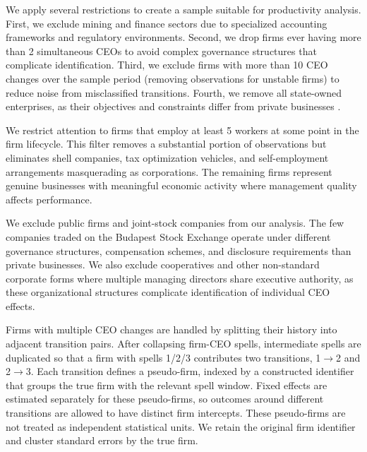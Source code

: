 \documentclass[11pt,a4paper]{article}
\begin{document}
We apply several restrictions to create a sample suitable for productivity analysis. First, we exclude mining and finance sectors due to specialized accounting frameworks and regulatory environments. Second, we drop firms ever having more than 2 simultaneous CEOs to avoid complex governance structures that complicate identification. Third, we exclude firms with more than 10 CEO changes over the sample period (removing observations for unstable firms) to reduce noise from misclassified transitions. Fourth, we remove all state-owned enterprises, as their objectives and constraints differ from private businesses \citep{orban2019inception, shleifer1994politicians}.

We restrict attention to firms that employ at least 5 workers at some point in the firm lifecycle. This filter removes a substantial portion of observations but eliminates shell companies, tax optimization vehicles, and self-employment arrangements masquerading as corporations. The remaining firms represent genuine businesses with meaningful economic activity where management quality affects performance.

We exclude public firms and joint-stock companies from our analysis. The few companies traded on the Budapest Stock Exchange operate under different governance structures, compensation schemes, and disclosure requirements than private businesses. We also exclude cooperatives and other non-standard corporate forms where multiple managing directors share executive authority, as these organizational structures complicate identification of individual CEO effects.

Firms with multiple CEO changes are handled by splitting their history into adjacent transition pairs. After collapsing firm-CEO spells, intermediate spells are duplicated so that a firm with spells 1/2/3 contributes two transitions, 1$\to$2 and 2$\to$3. Each transition defines a pseudo-firm, indexed by a constructed identifier that groups the true firm with the relevant spell window. Fixed effects are estimated separately for these pseudo-firms, so outcomes around different transitions are allowed to have distinct firm intercepts. These pseudo-firms are not treated as independent statistical units. We retain the original firm identifier and cluster standard errors by the true firm. 

\end{document}
